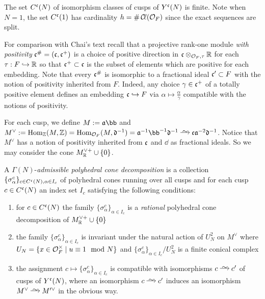 \documentclass[main.tex]{subfiles}
\begin{document}
{The set $C^{\mathfrak{c}}(N)$ of isomorphism classes of cusps of $Y^{\mathfrak{c}}(N)$ is finite. Note when $N = 1$, the set $C^{\mathfrak{c}}(1)$ has cardinality $h = \# \operatorname{\mathcal{C}\!{\ell}}(\mathcal{O}_F)$ since the exact sequences are split. 


\begin{rmk}
For comparison with Chai's text \cite{chai:arithmetic_compactifications} recall that a projective rank-one module \textit{with positivity} $\mathfrak{c}^{\#} = (\mathfrak{c}, \mathfrak{c}^+)$ is a choice of positive direction in $\mathfrak{c} \otimes_{\mathcal{O}_F, \tau} \mathbb{R}$ for each $\tau : F \hookrightarrow \mathbb{R}$ so that $\mathfrak{c}^+ \subset \mathfrak{c}$ is the subset of elements which are positive for each embedding. Note that every $\mathfrak{c}^{\#}$ is isomorphic to a fractional ideal $\mathfrak{c}' \subset F$ with the notion of positivity inherited from $F$. Indeed, any choice $\gamma \in \mathfrak{c}^+$ of a totally positive element defines an embedding $\mathfrak{c} \hookrightarrow F$ via $\alpha \mapsto \frac{\alpha}{\gamma}$ compatible with the notions of positivity. 
\end{rmk}

For each cusp, we define $M := \aa \bb$ and $M^{\vee} := \Hom_{\ZZ}(M, \ZZ) = \Hom_{\cO_F}(M, \dd^{-1}) = \aa^{-1} \bb^{-1} \dd^{-1} \iso \cc \aa^{-2} \dd^{-1}$. Notice that $M^{\vee}$ has a notion of positivity inherited from $\mathfrak{c}$ and $\dd$ as fractional ideals. So we may consider the cone $M_{\mathbb{R}}^{\vee +} \cup \{ 0 \}$.

\begin{defn}
A $\Gamma(N)$-\textit{admissible polyhedral cone decomposition} is a collection $\{ \sigma_{\alpha}^c \}_{c \in C^{\mathfrak{c}}(N), \alpha \in I_c}$ of polyhedral cones running over all cusps and for each cusp $c \in C^{\mathfrak{c}}(N)$ an index set $I_c$ satisfying the following conditions:
\begin{enumerate}
\item for $c \in C^{\mathfrak{c}}(N)$ the family $\{ \sigma^c_{\alpha} \}_{\alpha \in I_c}$ is a \textit{rational} polyhedral cone decomposition of $M_{\mathbb{R}}^{\vee +} \cup \{ 0 \}$
\item the family $\{ \sigma^c_{\alpha} \}_{\alpha \in I_c}$ is invariant under the natural action of $U_N^2$ on $M^{\vee}$ where $U_N = \{ x \in \mathcal{O}_F^\times \mid u \equiv 1 \mod N \}$ and $\{ \sigma^c_{\alpha} \}_{\alpha \in I_c} / U_N^2$ is a finite conical complex
\item the assignment $c \mapsto \{ \sigma^c_{\alpha} \}_{\alpha \in I_c}$ is compatible with isomorphisms $c \iso c'$ of cusps of $Y^{\mathfrak{c}}(N)$, where an isomorphism $c \iso c'$ induces an isomorphism $M^{\vee} \iso M'^{\vee}$ in the obvious way.
\end{enumerate}
\end{defn}

}
\end{document}
